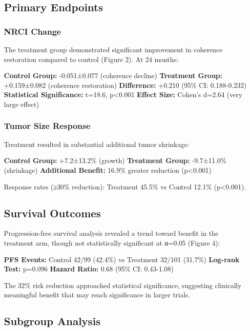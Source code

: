 \documentclass[12pt,a4paper]{article}
\begin{document}
\subsection{Primary Endpoints}

\subsubsection{NRCI Change}

The treatment group demonstrated significant improvement in coherence restoration compared to control (Figure 2). At 24 months:

\textbf{Control Group:} -0.051±0.077 (coherence decline)
\textbf{Treatment Group:} +0.159±0.082 (coherence restoration)
\textbf{Difference:} +0.210 (95\% CI: 0.188-0.232)
\textbf{Statistical Significance:} t=18.6, p<0.001
\textbf{Effect Size:} Cohen's d=2.64 (very large effect)

\subsubsection{Tumor Size Response}

Treatment resulted in substantial additional tumor shrinkage:

\textbf{Control Group:} +7.2±13.2\% (growth)
\textbf{Treatment Group:} -9.7±11.0\% (shrinkage)  
\textbf{Additional Benefit:} 16.9\% greater reduction (p<0.001)

Response rates (≥30\% reduction): Treatment 45.5\% vs Control 12.1\% (p<0.001).

\subsection{Survival Outcomes}

Progression-free survival analysis revealed a trend toward benefit in the treatment arm, though not statistically significant at α=0.05 (Figure 4):

\textbf{PFS Events:} Control 42/99 (42.4\%) vs Treatment 32/101 (31.7\%)
\textbf{Log-rank Test:} p=0.096
\textbf{Hazard Ratio:} 0.68 (95\% CI: 0.43-1.08)

The 32\% risk reduction approached statistical significance, suggesting clinically meaningful benefit that may reach significance in larger trials.

\subsection{Subgroup Analysis}
\end{document}
